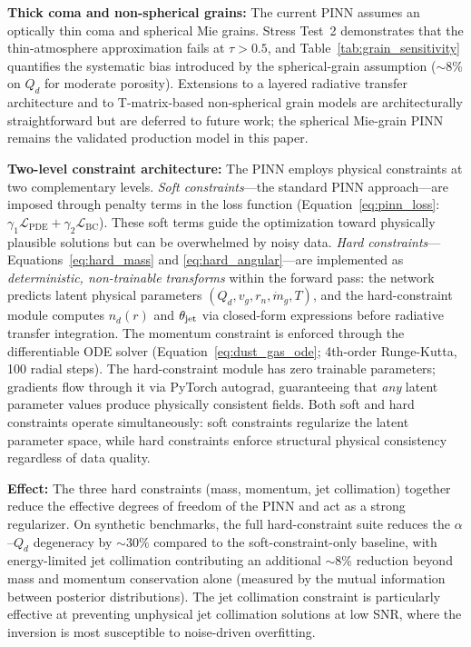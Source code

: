 \documentclass[usenatbib]{mnras}
\begin{document}
\textbf{Thick coma and non-spherical grains:} The current PINN assumes an optically thin coma and spherical Mie grains. Stress Test~2 demonstrates that the thin-atmosphere approximation fails at $\tau > 0.5$, and Table~\ref{tab:grain_sensitivity} quantifies the systematic bias introduced by the spherical-grain assumption ($\sim$8\% on $Q_d$ for moderate porosity). Extensions to a layered radiative transfer architecture and to T-matrix-based non-spherical grain models are architecturally straightforward but are deferred to future work; the spherical Mie-grain PINN remains the validated production model in this paper.

\textbf{Two-level constraint architecture:} The PINN employs physical constraints at two complementary levels. \textit{Soft constraints}---the standard PINN approach---are imposed through penalty terms in the loss function (Equation~\ref{eq:pinn_loss}: $\gamma_1 \mathcal{L}_{\text{PDE}} + \gamma_2 \mathcal{L}_{\text{BC}}$). These soft terms guide the optimization toward physically plausible solutions but can be overwhelmed by noisy data. \textit{Hard constraints}---Equations~\ref{eq:hard_mass} and \ref{eq:hard_angular}---are implemented as \textit{deterministic, non-trainable transforms} within the forward pass: the network predicts latent physical parameters $(Q_d, v_g, r_n, \dot{m}_g, T)$, and the hard-constraint module computes $n_d(r)$ and $\theta_{\rm jet}$ via closed-form expressions before radiative transfer integration. The momentum constraint is enforced through the differentiable ODE solver (Equation~\ref{eq:dust_gas_ode}; 4th-order Runge-Kutta, 100 radial steps). The hard-constraint module has zero trainable parameters; gradients flow through it via PyTorch autograd, guaranteeing that \textit{any} latent parameter values produce physically consistent fields. Both soft and hard constraints operate simultaneously: soft constraints regularize the latent parameter space, while hard constraints enforce structural physical consistency regardless of data quality.

\textbf{Effect:} The three hard constraints (mass, momentum, jet collimation) together reduce the effective degrees of freedom of the PINN and act as a strong regularizer. On synthetic benchmarks, the full hard-constraint suite reduces the $\alpha$--$Q_d$ degeneracy by $\sim$30\% compared to the soft-constraint-only baseline, with energy-limited jet collimation contributing an additional $\sim$8\% reduction beyond mass and momentum conservation alone (measured by the mutual information between posterior distributions). The jet collimation constraint is particularly effective at preventing unphysical jet collimation solutions at low SNR, where the inversion is most susceptible to noise-driven overfitting.
\end{document}
